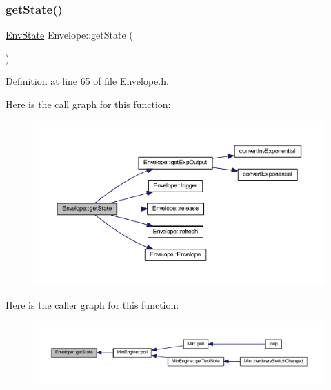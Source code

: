 \subsubsection{\texorpdfstring{get\+State()}{getState()}}
{\footnotesize\ttfamily \hyperlink{class_envelope_a16c15d3d555a1a27869f48696f430d5f}{Env\+State} Envelope\+::get\+State (\begin{DoxyParamCaption}{ }\end{DoxyParamCaption})\hspace{0.3cm}{\ttfamily [inline]}}



Definition at line 65 of file Envelope.\+h.

Here is the call graph for this function\+:
\nopagebreak
\begin{figure}[H]
\begin{center}
\leavevmode
\includegraphics[width=350pt]{d7/df3/class_envelope_a1d3627f6be1cce69aae37575b9bcdc69_cgraph}
\end{center}
\end{figure}
Here is the caller graph for this function\+:
\nopagebreak
\begin{figure}[H]
\begin{center}
\leavevmode
\includegraphics[width=350pt]{d7/df3/class_envelope_a1d3627f6be1cce69aae37575b9bcdc69_icgraph}
\end{center}
\end{figure}
\mbox{\label{class_envelope_a4cc2bb1ba420ecd053c4a1ad8ed0ab7d}} 
